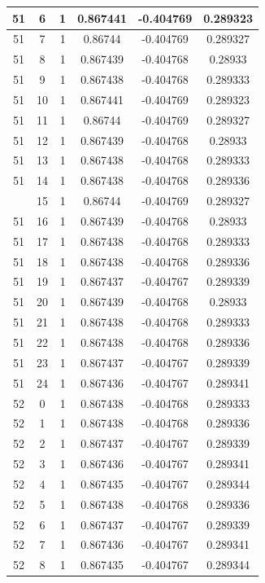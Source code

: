 \documentclass[12pt,a4paper]{article}
\numberwithin{equation}{section}
\numberwithin{figure}{section}
\numberwithin{table}{section}
\begin{document}
\begin{longtable}{|c|c|c|c|c|c|}
51 & 6 & 1 & 0.867441 & -0.404769 & 0.289323 \\ \hline
51 & 7 & 1 & 0.86744 & -0.404769 & 0.289327 \\ \hline
51 & 8 & 1 & 0.867439 & -0.404768 & 0.28933 \\ \hline
51 & 9 & 1 & 0.867438 & -0.404768 & 0.289333 \\ \hline
51 & 10 & 1 & 0.867441 & -0.404769 & 0.289323 \\ \hline
51 & 11 & 1 & 0.86744 & -0.404769 & 0.289327 \\ \hline
51 & 12 & 1 & 0.867439 & -0.404768 & 0.28933 \\ \hline
51 & 13 & 1 & 0.867438 & -0.404768 & 0.289333 \\ \hline
51 & 14 & 1 & 0.867438 & -0.404768 & 0.289336 \\ \hline
\pagebreak
51 & 15 & 1 & 0.86744 & -0.404769 & 0.289327 \\ \hline
51 & 16 & 1 & 0.867439 & -0.404768 & 0.28933 \\ \hline
51 & 17 & 1 & 0.867438 & -0.404768 & 0.289333 \\ \hline
51 & 18 & 1 & 0.867438 & -0.404768 & 0.289336 \\ \hline
51 & 19 & 1 & 0.867437 & -0.404767 & 0.289339 \\ \hline
51 & 20 & 1 & 0.867439 & -0.404768 & 0.28933 \\ \hline
51 & 21 & 1 & 0.867438 & -0.404768 & 0.289333 \\ \hline
51 & 22 & 1 & 0.867438 & -0.404768 & 0.289336 \\ \hline
51 & 23 & 1 & 0.867437 & -0.404767 & 0.289339 \\ \hline
51 & 24 & 1 & 0.867436 & -0.404767 & 0.289341 \\ \hline
52 & 0 & 1 & 0.867438 & -0.404768 & 0.289333 \\ \hline
52 & 1 & 1 & 0.867438 & -0.404768 & 0.289336 \\ \hline
52 & 2 & 1 & 0.867437 & -0.404767 & 0.289339 \\ \hline
52 & 3 & 1 & 0.867436 & -0.404767 & 0.289341 \\ \hline
52 & 4 & 1 & 0.867435 & -0.404767 & 0.289344 \\ \hline
52 & 5 & 1 & 0.867438 & -0.404768 & 0.289336 \\ \hline
52 & 6 & 1 & 0.867437 & -0.404767 & 0.289339 \\ \hline
52 & 7 & 1 & 0.867436 & -0.404767 & 0.289341 \\ \hline
52 & 8 & 1 & 0.867435 & -0.404767 & 0.289344 \\ \hline

\end{longtable}
\end{document}
